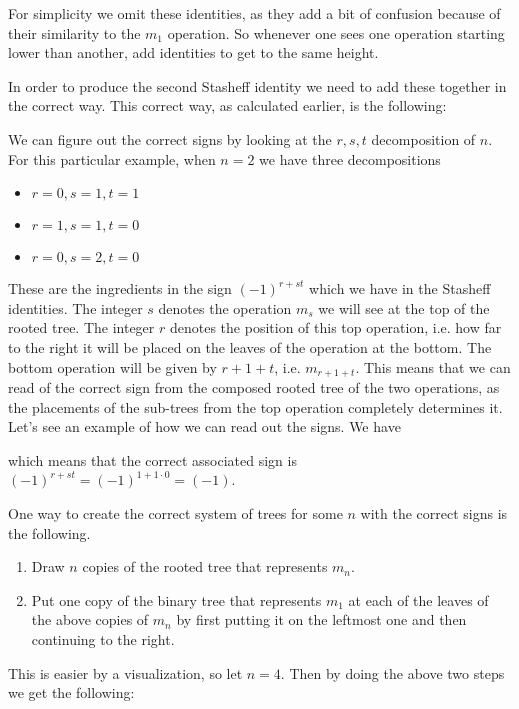 For simplicity we omit these identities, as they add a bit of confusion because of their similarity to the $m_1$ operation. So whenever one sees one operation starting lower than another, add identities to get to the same height.

In order to produce the second Stasheff identity we need to add these together in the correct way. This correct way, as calculated earlier, is the following:


We can figure out the correct signs by looking at the $r, s, t$ decomposition of $n$. For this particular example, when $n=2$ we have three decompositions
\begin{itemize}
    \item $r=0, s=1, t=1$
    \item $r=1, s=1, t=0$
    \item $r=0, s=2, t=0$
\end{itemize}
These are the ingredients in the sign $(-1)^{r+st}$ which we have in the Stasheff identities. The integer $s$ denotes the operation $m_s$ we will see at the top of the rooted tree. The integer $r$ denotes the position of this top operation, i.e. how far to the right it will be placed on the leaves of the operation at the bottom. The bottom operation will be given by $r+1+t$, i.e. $m_{r+1+t}$. This means that we can read of the correct sign from the composed rooted tree of the two operations, as the placements of the sub-trees from the top operation completely determines it. Let's see an example of how we can read out the signs. We have


which means that the correct associated sign is $(-1)^{r+st}=(-1)^{1+1\cdot 0}=(-1)$. 





One way to create the correct system of trees for some  $n$ with the correct signs is the following. 
\begin{enumerate}
    \item Draw $n$ copies of the rooted tree that represents $m_n$. 
    \item Put one copy of the binary tree that represents $m_1$ at each of the leaves of the above copies of $m_n$ by first putting it on the leftmost one and then continuing to the right. 
\end{enumerate}
This is easier by a visualization, so let $n=4$. Then by doing the above two steps we get the following:

